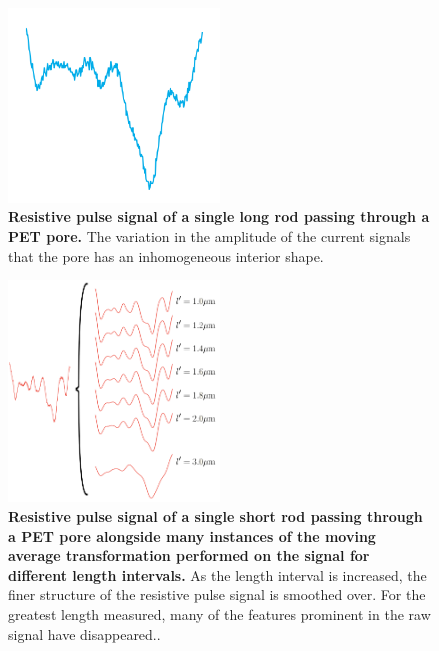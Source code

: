 			
			\begin{figure}
				\includegraphics[width=0.5\textwidth]{longevent.png}
				\caption{\textbf{Resistive pulse signal of a single long rod passing through a PET pore.} The variation in the amplitude of the current signals that the pore has an inhomogeneous interior shape.}
				\label{fig:longevent}
			\end{figure}

			
			\begin{figure}
				\includegraphics[width=0.5\textwidth]{experimentaldtwfits.png}
				\caption{\textbf{Resistive pulse signal of a single short rod passing through a PET pore alongside many instances of the moving average transformation performed on the signal for different length intervals.} As the length interval is increased, the finer structure of the resistive pulse signal is smoothed over. For the greatest length measured, many of the features prominent in the raw signal have disappeared..}
				\label{fig:experimentaldtwfits}
			\end{figure}
			
